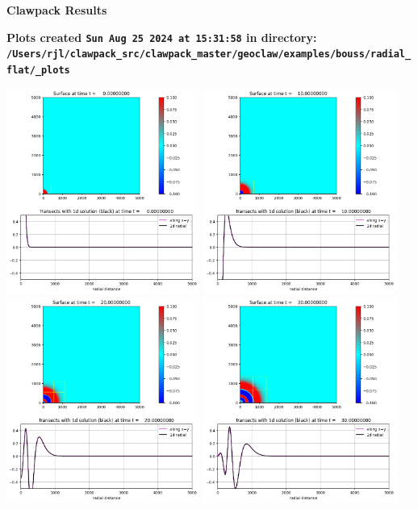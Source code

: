 \documentclass[11pt]{article}
\begin{document}
        \begin{center}{\Large\bf Clawpack Results}\vskip 5pt
        
        \bf Plots created {\tt Sun Aug 25 2024 at 15:31:58} in directory: \vskip 5pt
        \verb+/Users/rjl/clawpack_src/clawpack_master/geoclaw/examples/bouss/radial_flat/_plots+
        \end{center}
        \vskip 5pt
        \includegraphics[width=0.475\textwidth]{frame0000fig20.png}
\vskip 10pt 
\includegraphics[width=0.475\textwidth]{frame0001fig20.png}
\vskip 10pt 
\includegraphics[width=0.475\textwidth]{frame0002fig20.png}
\vskip 10pt 
\includegraphics[width=0.475\textwidth]{frame0003fig20.png}
\end{document}

